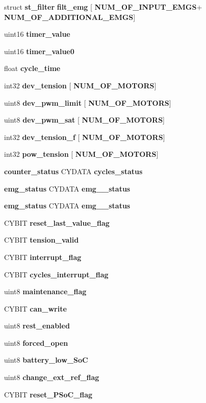 \begin{DoxyCompactItemize}
struct \textbf{ st\+\_\+filter} \textbf{ filt\+\_\+emg} [\textbf{ N\+U\+M\+\_\+\+O\+F\+\_\+\+I\+N\+P\+U\+T\+\_\+\+E\+M\+GS}+\textbf{ N\+U\+M\+\_\+\+O\+F\+\_\+\+A\+D\+D\+I\+T\+I\+O\+N\+A\+L\+\_\+\+E\+M\+GS}]
\item 
uint16 \textbf{ timer\+\_\+value}
\item 
uint16 \textbf{ timer\+\_\+value0}
\item 
float \textbf{ cycle\+\_\+time}
\item 
int32 \textbf{ dev\+\_\+tension} [\textbf{ N\+U\+M\+\_\+\+O\+F\+\_\+\+M\+O\+T\+O\+RS}]
\item 
uint8 \textbf{ dev\+\_\+pwm\+\_\+limit} [\textbf{ N\+U\+M\+\_\+\+O\+F\+\_\+\+M\+O\+T\+O\+RS}]
\item 
uint8 \textbf{ dev\+\_\+pwm\+\_\+sat} [\textbf{ N\+U\+M\+\_\+\+O\+F\+\_\+\+M\+O\+T\+O\+RS}]
\item 
int32 \textbf{ dev\+\_\+tension\+\_\+f} [\textbf{ N\+U\+M\+\_\+\+O\+F\+\_\+\+M\+O\+T\+O\+RS}]
\item 
int32 \textbf{ pow\+\_\+tension} [\textbf{ N\+U\+M\+\_\+\+O\+F\+\_\+\+M\+O\+T\+O\+RS}]
\item 
\textbf{ counter\+\_\+status} C\+Y\+D\+A\+TA \textbf{ cycles\+\_\+status}
\item 
\textbf{ emg\+\_\+status} C\+Y\+D\+A\+TA \textbf{ emg\+\_\+\_\+status}
\item 
\textbf{ emg\+\_\+status} C\+Y\+D\+A\+TA \textbf{ emg\+\_\+\_\+status}
\item 
C\+Y\+B\+IT \textbf{ reset\+\_\+last\+\_\+value\+\_\+flag}
\item 
C\+Y\+B\+IT \textbf{ tension\+\_\+valid}
\item 
C\+Y\+B\+IT \textbf{ interrupt\+\_\+flag}
\item 
C\+Y\+B\+IT \textbf{ cycles\+\_\+interrupt\+\_\+flag}
\item 
uint8 \textbf{ maintenance\+\_\+flag}
\item 
C\+Y\+B\+IT \textbf{ can\+\_\+write}
\item 
uint8 \textbf{ rest\+\_\+enabled}
\item 
uint8 \textbf{ forced\+\_\+open}
\item 
uint8 \textbf{ battery\+\_\+low\+\_\+\+SoC}
\item 
uint8 \textbf{ change\+\_\+ext\+\_\+ref\+\_\+flag}
\item 
C\+Y\+B\+IT \textbf{ reset\+\_\+\+P\+So\+C\+\_\+flag}
\item 
\mbox{\label{globals_8h_a2fbad668712e226379890e1debdc9ff2}} 

\end{DoxyCompactItemize}
